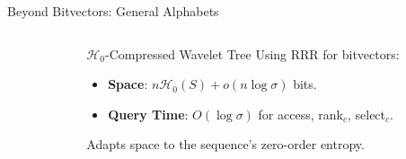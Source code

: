 \begin{frame}{Beyond Bitvectors: General Alphabets}
{\begin{columns}[T]
\begin{column}{0.55\textwidth}
            \end{column}
            \begin{column}{0.45\textwidth} %
                \begin{block}{$\mathcal{H}_0$-Compressed Wavelet Tree} %
                    Using RRR for bitvectors:
                    \begin{itemize}
                        \item \textbf{Space}: $n \mathcal{H}_0(S) + o(n \log \sigma)$ bits.
                        \item \textbf{Query Time}: $O(\log \sigma)$ for \textsf{access}, \textsf{rank}$_c$, \textsf{select}$_c$.
                    \end{itemize}
                    Adapts space to the sequence's zero-order entropy.
                \end{block}
            \end{column}
        \end{columns}
    }
\end{frame}

